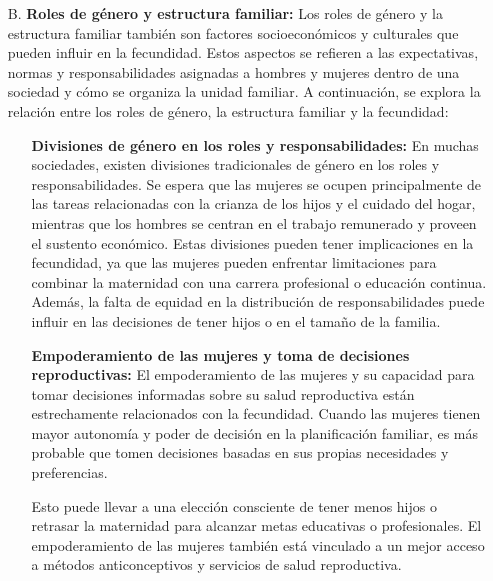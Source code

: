 \documentclass[8pt,a4paper]{beamer}
\begin{document}
{\begin{frame}{}
\begin{block}{}
\begin{enumerate}
\setlength{\parskip}{3px}
\justifying
\item[B.] \textbf{Roles de género y estructura familiar:} Los roles de género y la estructura familiar también son factores socioeconómicos y culturales que pueden influir en la fecundidad. Estos aspectos se refieren a las expectativas, normas y responsabilidades asignadas a hombres y mujeres dentro de una sociedad y cómo se organiza la unidad familiar. A continuación, se explora la relación entre los roles de género, la estructura familiar y la fecundidad:
\begin{enumerate}
\setlength{\parskip}{3px}
\justifying
\item[\ding{65}] \textbf{Divisiones de género en los roles y responsabilidades:} En muchas sociedades, existen divisiones tradicionales de género en los roles y responsabilidades. Se espera que las mujeres se ocupen principalmente de las tareas relacionadas con la crianza de los hijos y el cuidado del hogar, mientras que los hombres se centran en el trabajo remunerado y proveen el sustento económico. Estas divisiones pueden tener implicaciones en la fecundidad, ya que las mujeres pueden enfrentar limitaciones para combinar la maternidad con una carrera profesional o educación continua. Además, la falta de equidad en la distribución de responsabilidades puede influir en las decisiones de tener hijos o en el tamaño de la familia.

\item[\ding{65}]\textbf{Empoderamiento de las mujeres y toma de decisiones reproductivas:} El empoderamiento de las mujeres y su capacidad para tomar decisiones informadas sobre su salud reproductiva están estrechamente relacionados con la fecundidad. Cuando las mujeres tienen mayor autonomía y poder de decisión en la planificación familiar, es más probable que tomen decisiones basadas en sus propias necesidades y preferencias. 
\end{enumerate}

\end{enumerate}
\end{block}
\end{frame}

\begin{frame}{}
\begin{block}{}
\setlength{\parskip}{3px}
\justifying
\begin{enumerate}
\setlength{\parskip}{3px}
\justifying
\item[{}] 
\begin{enumerate}
\setlength{\parskip}{3px}
\justifying
\item[{}] Esto puede llevar a una elección consciente de tener menos hijos o retrasar la maternidad para alcanzar metas educativas o profesionales. El empoderamiento de las mujeres también está vinculado a un mejor acceso a métodos anticonceptivos y servicios de salud reproductiva.


\end{enumerate}
\end{enumerate}
\end{block}
\end{frame}}
\end{document}
